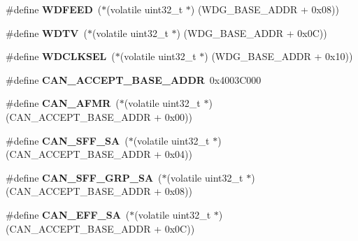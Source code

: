 \begin{DoxyCompactItemize}
\#define {\bfseries W\+D\+F\+E\+ED}~($\ast$(volatile uint32\+\_\+t $\ast$) (W\+D\+G\+\_\+\+B\+A\+S\+E\+\_\+\+A\+D\+DR + 0x08))
\item 
\mbox{\label{group__lpc24xx__regs_gab558486d90264fa951c0cb12f09e328a}} 
\#define {\bfseries W\+D\+TV}~($\ast$(volatile uint32\+\_\+t $\ast$) (W\+D\+G\+\_\+\+B\+A\+S\+E\+\_\+\+A\+D\+DR + 0x0\+C))
\item 
\mbox{\label{group__lpc24xx__regs_ga3e8a3bb108e9d8c0389e4e715f097be0}} 
\#define {\bfseries W\+D\+C\+L\+K\+S\+EL}~($\ast$(volatile uint32\+\_\+t $\ast$) (W\+D\+G\+\_\+\+B\+A\+S\+E\+\_\+\+A\+D\+DR + 0x10))
\item 
\mbox{\label{group__lpc24xx__regs_ga551b07be3174f148c975a19fafe8d1cb}} 
\#define {\bfseries C\+A\+N\+\_\+\+A\+C\+C\+E\+P\+T\+\_\+\+B\+A\+S\+E\+\_\+\+A\+D\+DR}~0x4003\+C000
\item 
\mbox{\label{group__lpc24xx__regs_ga9bd4eb329cd2d0b75e21615122a0701a}} 
\#define {\bfseries C\+A\+N\+\_\+\+A\+F\+MR}~($\ast$(volatile uint32\+\_\+t $\ast$) (C\+A\+N\+\_\+\+A\+C\+C\+E\+P\+T\+\_\+\+B\+A\+S\+E\+\_\+\+A\+D\+DR + 0x00))
\item 
\mbox{\label{group__lpc24xx__regs_ga57ee3c32325903c2cfc48981d7c42149}} 
\#define {\bfseries C\+A\+N\+\_\+\+S\+F\+F\+\_\+\+SA}~($\ast$(volatile uint32\+\_\+t $\ast$) (C\+A\+N\+\_\+\+A\+C\+C\+E\+P\+T\+\_\+\+B\+A\+S\+E\+\_\+\+A\+D\+DR + 0x04))
\item 
\mbox{\label{group__lpc24xx__regs_gada43fe02cbbbdec6cd50171a5bc4d3a1}} 
\#define {\bfseries C\+A\+N\+\_\+\+S\+F\+F\+\_\+\+G\+R\+P\+\_\+\+SA}~($\ast$(volatile uint32\+\_\+t $\ast$) (C\+A\+N\+\_\+\+A\+C\+C\+E\+P\+T\+\_\+\+B\+A\+S\+E\+\_\+\+A\+D\+DR + 0x08))
\item 
\mbox{\label{group__lpc24xx__regs_ga05ce77afb49b9b8f1e8596de6607466c}} 
\#define {\bfseries C\+A\+N\+\_\+\+E\+F\+F\+\_\+\+SA}~($\ast$(volatile uint32\+\_\+t $\ast$) (C\+A\+N\+\_\+\+A\+C\+C\+E\+P\+T\+\_\+\+B\+A\+S\+E\+\_\+\+A\+D\+DR + 0x0\+C))
\item 
\mbox{\label{group__lpc24xx__regs_gaa9d157f2ed54b277860001ab5375aad7}} 

\end{DoxyCompactItemize}
